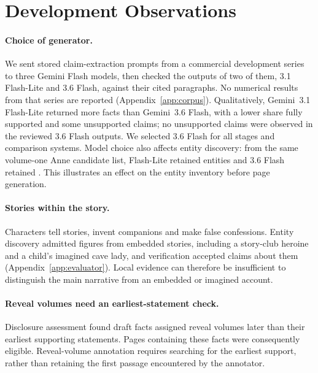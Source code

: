 \section{Development Observations}
\label{app:observations}

\paragraph{Choice of generator.} We sent stored claim-extraction prompts from a commercial
development series to three Gemini Flash models, then checked the outputs of two of them,
3.1 Flash-Lite and 3.6 Flash, against their cited paragraphs. No numerical results from that series are reported
(Appendix~\ref{app:corpus}). Qualitatively, Gemini~3.1 Flash-Lite returned more facts than
Gemini~3.6 Flash, with a lower share fully supported and some unsupported claims; no
unsupported claims were observed in the reviewed 3.6 Flash outputs. We selected 3.6 Flash
for all stages and comparison systems. Model choice also affects entity discovery: from
the same volume-one Anne candidate list, Flash-Lite retained  entities
and 3.6 Flash retained . This illustrates an effect on the entity inventory
before page generation.

\paragraph{Stories within the story.} Characters tell stories, invent companions and make
false confessions. Entity discovery admitted figures from embedded stories, including a
story-club heroine and a child's imagined cave lady, and verification accepted claims about
them (Appendix~\ref{app:evaluator}). Local evidence can therefore be insufficient to
distinguish the main narrative from an embedded or imagined account.

\paragraph{Reveal volumes need an earliest-statement check.} Disclosure assessment found
 draft facts assigned reveal volumes later than their earliest supporting
statements. Pages containing these facts were consequently eligible. Reveal-volume
annotation requires searching for the earliest support, rather than retaining the first
passage encountered by the annotator.

